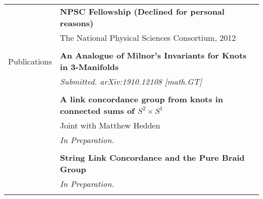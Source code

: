 \documentclass[letterpaper,11pt,oneside]{article}
\begin{document}
\begin{tabular}{@{} l l}
     
          & \textbf{NPSC Fellowship (Declined for personal reasons)} \\
     & The National Physical Sciences Consortium, 2012 \\
     & \\
     
 
    
 \Large{Publications}   
 & \textbf{An Analogue of Milnor's Invariants for Knots in 3-Manifolds}  \\
     & \sl{Submitted. arXiv:1910.12108 [math.GT]}  \\
     & \\
  & \textbf{A link concordance group from knots in connected sums of $S^2 \times S^1$} \\
     & Joint with Matthew Hedden \\
     & \sl{In Preparation.}  \\
     & \\
     
       & \textbf{String Link Concordance and the Pure Braid Group} \\
     & \sl{In Preparation.}  \\
     & \\
           \end{tabular}
\end{document}
